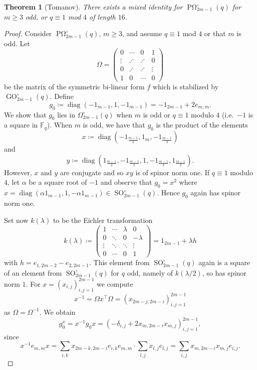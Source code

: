 \documentclass[a4paper,11pt]{amsproc}
\newcommand{\finfield}{\mathbb{F}}%
\DeclareMathOperator{\diag}{diag}%
\DeclareMathOperator{\GO}{GO}%
\DeclareMathOperator{\SO}{SO}%
\DeclareMathOperator{\POmega}{P\Omega}
\theoremstyle{plain}
\newtheorem{theorem}{Theorem}
\theoremstyle{definition}
\begin{document}
	\begin{theorem}[Tomanov] \label{thm:tomanov1}
		There exists a mixed identity for $\POmega^\circ_{2m-1}(q)$ for $m\geq3$ odd, or $q\equiv 1$ mod $4$ of length $16$.
	\end{theorem}
	\begin{proof}
		Consider $\POmega^\circ_{2m-1}(q)$, $m \geq 3$, and assume $q\equiv 1$ mod $4$ or that $m$ is odd. Let 
		$$
		\Omega=\begin{pmatrix} 0 & \cdots & 0 & 1\\
			\vdots & \iddots & \iddots & 0\\
			0 & \iddots & \iddots & \vdots\\
			1 & 0 & \cdots & 0
		\end{pmatrix}
		$$
		be the matrix of the symmetric bi-linear form $f$ which is stabilized by $\GO^\circ_{2m-1}(q)$. Define 
		$$
		g_0\coloneqq\diag(-1_{m-1},1,-1_{m-1})=-1_{2m-1}+2 e_{m,m}.
		$$
		We show that $g_0$ lies in $\Omega_{2m-1}^\circ(q)$ when $m$ is odd or $q\equiv 1$ modulo $4$ (i.e.\ $-1$ is a square in $\finfield_q$). When $m$ is odd, we have that $g_0$ is the product of the elements 
		$$x\coloneqq\diag(-1_{\frac{m-1}{2}},1_m,-1_{\frac{m-1}{2}})$$ and $$y\coloneqq\diag(1_{\frac{m-1}{2}},-1_{\frac{m-1}{2}},1,-1_{\frac{m-1}{2}},1_{\frac{m-1}{2}}).$$ However, $x$ and $y$ are conjugate and so $xy$ is of spinor norm one. If $q\equiv 1$ modulo $4$, let $\alpha$ be a square root of $-1$ and observe that $g_0=x^2$ where $x=\diag(\alpha 1_{m-1},1,-\alpha 1_{m-1})\in\SO_{2m-1}^\circ(q)$. Hence $g_0$ again has spinor norm one.
		
		Set now $k(\lambda)$ to be the Eichler transformation
		$$
		k(\lambda)\coloneqq\begin{pmatrix}
			1 & \cdots & \lambda & 0\\
			0 & \ddots & 0 & -\lambda\\
			\vdots & \ddots & \ddots & \vdots\\
			0 & \cdots & 0 & 1
		\end{pmatrix} = 1_{2m-1} + \lambda h
		$$
		with $h=e_{1,2m-2} - e_{2,2m-1}.$ This element from $\SO^\circ_{2m-1}(q)$ again is a square of an element from $\SO^\circ_{2m-1}(q)$ for $q$ odd, namely of $k(\lambda/2)$, so has spinor norm $1$.
		For $x=(x_{i,j})_{i,j=1}^{2m-1}$ we compute 
		$$
		x^{-1} = \Omega x^\top \Omega = (x_{2m-j,2m-i})_{i,j=1}^{2m-1}
		$$
		as $\Omega=\Omega^{-1}$.
		We obtain 
		$$
		g_0^x = x^{-1} g_0 x = (-\delta_{i,j} + 2 x_{m,2m-i} x_{m,j})_{i,j=1}^{2m-1},
		$$
		since
		$$
		x^{-1}e_{m,m}x =\sum_{i,k} x_{2m-k,2m-i} e_{i,k} e_{m,m} \cdot \sum_{l,j} x_{l,j} e_{l,j} = \sum_{i,j} x_{m,2m-i} x_{m,j} e_{i,j}.
		$$
		

\end{proof}
\end{document}
